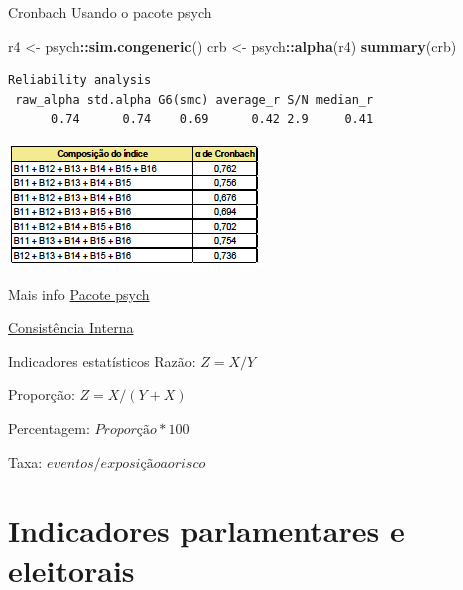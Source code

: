 \documentclass[
  9pt,
  ignorenonframetext,
  aspectratio=169]{beamer}
\newenvironment{Shaded}{\begin{snugshade}}{\end{snugshade}}
\newcommand{\KeywordTok}[1]{\textcolor[rgb]{0.13,0.29,0.53}{\textbf{#1}}}
\newcommand{\NormalTok}[1]{#1}
\newcommand{\OperatorTok}[1]{\textcolor[rgb]{0.81,0.36,0.00}{\textbf{#1}}}
\newcommand{\StringTok}[1]{\textcolor[rgb]{0.31,0.60,0.02}{#1}}
\begin{document}
\begin{frame}[fragile]{Cronbach}
\protect\hypertarget{cronbach}{}
Usando o pacote psych

\begin{Shaded}
\begin{Highlighting}[]
\NormalTok{r4 \textless{}{-}}\StringTok{ }\NormalTok{psych}\OperatorTok{::}\KeywordTok{sim.congeneric}\NormalTok{()}
\NormalTok{crb \textless{}{-}}\StringTok{ }\NormalTok{psych}\OperatorTok{::}\KeywordTok{alpha}\NormalTok{(r4)}
\KeywordTok{summary}\NormalTok{(crb)}
\end{Highlighting}
\end{Shaded}

\begin{verbatim}
Reliability analysis   
 raw_alpha std.alpha G6(smc) average_r S/N median_r
      0.74      0.74    0.69      0.42 2.9     0.41
\end{verbatim}
\end{frame}

\begin{frame}{}
\protect\hypertarget{section-3}{}
\includegraphics{imgs/result_exemplo.png}
\end{frame}

\begin{frame}{Mais info}
\protect\hypertarget{mais-info}{}
\href{http://personality-project.org/r/psych/}{Pacote psych}

\href{https://www.r-bloggers.com/2016/08/five-ways-to-calculate-internal-consistency/}{Consistência
Interna}
\end{frame}

\begin{frame}{Indicadores estatísticos}
\protect\hypertarget{indicadores-estatuxedsticos}{}
Razão: \(Z=X/Y\)

Proporção: \(Z=X/(Y+X)\)

Percentagem: \(Proporção*100\)

Taxa: \(eventos/exposição ao risco\)
\end{frame}

\hypertarget{indicadores-parlamentares-e-eleitorais}{%
\section{Indicadores parlamentares e
eleitorais}\label{indicadores-parlamentares-e-eleitorais}}
\end{document}
